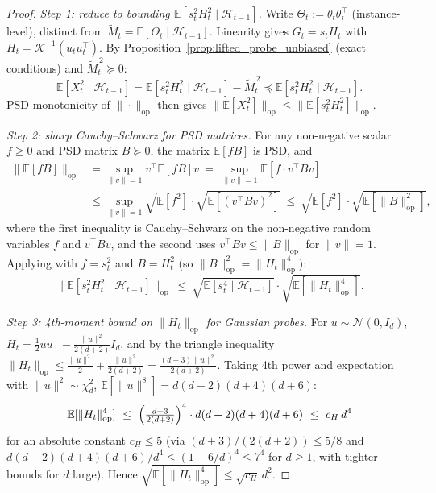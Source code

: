 \documentclass[11pt]{article}
\newcommand{\E}{\mathbb{E}}
\newcommand{\op}{\mathrm{op}}
\newcommand{\cH}{\mathcal{H}}
\begin{document}
\begin{proof}
\emph{Step 1: reduce to bounding $\E[s_t^2H_t^2\mid\cH_{t-1}]$.}
Write $\Theta_t:=\theta_t\theta_t^\top$ (instance-level), distinct from
$\widetilde M_t=\E[\Theta_t\mid\cH_{t-1}]$.  Linearity gives
$G_t=s_t H_t$ with $H_t=\mathcal K^{-1}(u_tu_t^\top)$.  By
Proposition~\ref{prop:lifted_probe_unbiased} (exact conditions) and
$\widetilde M_t^{\,2}\succeq 0$:
\begin{equation}
  \E[X_t^2\mid\cH_{t-1}]=\E[s_t^2 H_t^2\mid\cH_{t-1}]-\widetilde M_t^{\,2}
  \preceq\E[s_t^2 H_t^2\mid\cH_{t-1}].
  \label{eq:Xt2_bound}
\end{equation}
PSD monotonicity of $\|\cdot\|_{\op}$ then gives
$\|\E[X_t^2]\|_{\op}\le\|\E[s_t^2 H_t^2]\|_{\op}$.

\emph{Step 2: sharp Cauchy--Schwarz for PSD matrices.}
For any non-negative scalar $f\ge 0$ and PSD matrix $B\succeq 0$, the matrix
$\E[fB]$ is PSD, and
\begin{align*}
  \|\E[fB]\|_{\op}
  &=\sup_{\|v\|=1}v^\top\E[fB]v
  \ =\ \sup_{\|v\|=1}\E[f\cdot v^\top B v]\\
  &\le\sup_{\|v\|=1}\sqrt{\E[f^2]}\cdot\sqrt{\E[(v^\top Bv)^2]}
  \ \le\ \sqrt{\E[f^2]}\cdot\sqrt{\E[\|B\|_{\op}^2]},
\end{align*}
where the first inequality is Cauchy--Schwarz on the non-negative random
variables $f$ and $v^\top Bv$, and the second uses $v^\top Bv\le\|B\|_{\op}$
for $\|v\|=1$.  Applying with $f=s_t^2$ and $B=H_t^2$ (so $\|B\|_{\op}^2=\|H_t\|_{\op}^4$):
\begin{equation}
  \bigl\|\E[s_t^2 H_t^2\mid\cH_{t-1}]\bigr\|_{\op}
  \ \le\ \sqrt{\E[s_t^4\mid\cH_{t-1}]}\cdot\sqrt{\E[\|H_t\|_{\op}^4]}.
  \label{eq:sharp_cauchy_schwarz}
\end{equation}

\emph{Step 3: 4th-moment bound on $\|H_t\|_{\op}$ for Gaussian probes.}
For $u\sim\mathcal N(0,I_d)$,
$H_t=\tfrac 12 uu^\top-\tfrac{\|u\|^2}{2(d+2)}I_d$, and by the triangle
inequality $\|H_t\|_{\op}\le\tfrac{\|u\|^2}{2}+\tfrac{\|u\|^2}{2(d+2)}=\tfrac{(d+3)\|u\|^2}{2(d+2)}$.
Taking 4th power and expectation with $\|u\|^2\sim\chi^2_d$,
$\mathbb E[\|u\|^8]=d(d+2)(d+4)(d+6)$:
\begin{equation}
  \E[\|H_t\|_{\op}^4]
  \ \le\ \Bigl(\tfrac{d+3}{2(d+2)}\Bigr)^4\cdot d(d+2)(d+4)(d+6)
  \ \le\ c_H\,d^4
  \label{eq:H4_moment_bound}
\end{equation}
for an absolute constant $c_H\le 5$ (via $(d+3)/(2(d+2))\le 5/8$ and
$d(d+2)(d+4)(d+6)/d^4\le(1+6/d)^4\le 7^4$ for $d\ge 1$, with tighter bounds
for $d$ large).
Hence $\sqrt{\E[\|H_t\|_{\op}^4]}\le\sqrt{c_H}\,d^2$.


\end{proof}
\end{document}
